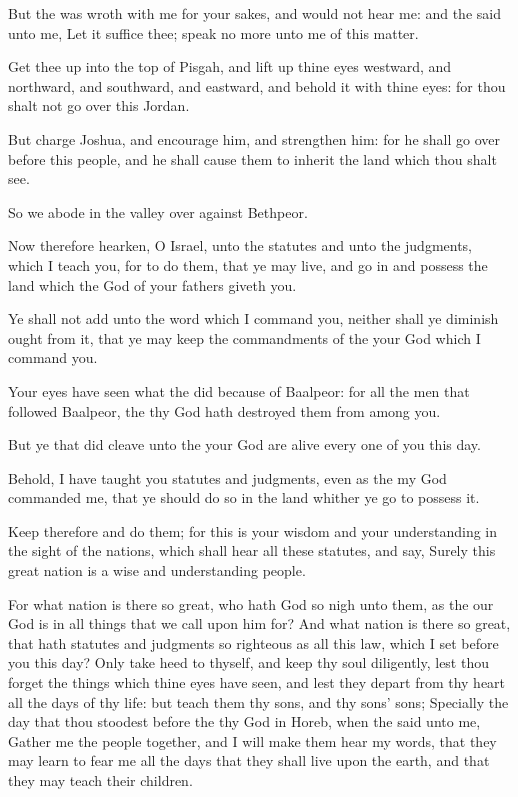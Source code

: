 \Verse But the \LORD was wroth with me for your sakes, and would not hear me: and the \LORD said unto me, Let it suffice thee; speak no more unto me of this matter.

\Verse Get thee up into the top of Pisgah, and lift up thine eyes westward, and northward, and southward, and eastward, and behold it with thine eyes: for thou shalt not go over this Jordan.

\Verse But charge Joshua, and encourage him, and strengthen him: for he shall go over before this people, and he shall cause them to inherit the land which thou shalt see.

\Verse So we abode in the valley over against Bethpeor.


\Chapter
\Verse Now therefore hearken, O Israel, unto the statutes and unto the judgments, which I teach you, for to do them, that ye may live, and go in and possess the land which the \LORD God of your fathers giveth you.

\Verse Ye shall not add unto the word which I command you, neither shall ye diminish ought from it, that ye may keep the commandments of the \LORD your God which I command you.

\Verse Your eyes have seen what the \LORD did because of Baalpeor: for all the men that followed Baalpeor, the \LORD thy God hath destroyed them from among you.

\Verse But ye that did cleave unto the \LORD your God are alive every one of you this day.

\Verse Behold, I have taught you statutes and judgments, even as the \LORD my God commanded me, that ye should do so in the land whither ye go to possess it.

\Verse Keep therefore and do them; for this is your wisdom and your understanding in the sight of the nations, which shall hear all these statutes, and say, Surely this great nation is a wise and understanding people.

\Verse For what nation is there so great, who hath God so nigh unto them, as the \LORD our God is in all things that we call upon him for?  \Verse And what nation is there so great, that hath statutes and judgments so righteous as all this law, which I set before you this day?  \Verse Only take heed to thyself, and keep thy soul diligently, lest thou forget the things which thine eyes have seen, and lest they depart from thy heart all the days of thy life: but teach them thy sons, and thy sons' sons; \Verse Specially the day that thou stoodest before the \LORD thy God in Horeb, when the \LORD said unto me, Gather me the people together, and I will make them hear my words, that they may learn to fear me all the days that they shall live upon the earth, and that they may teach their children.


